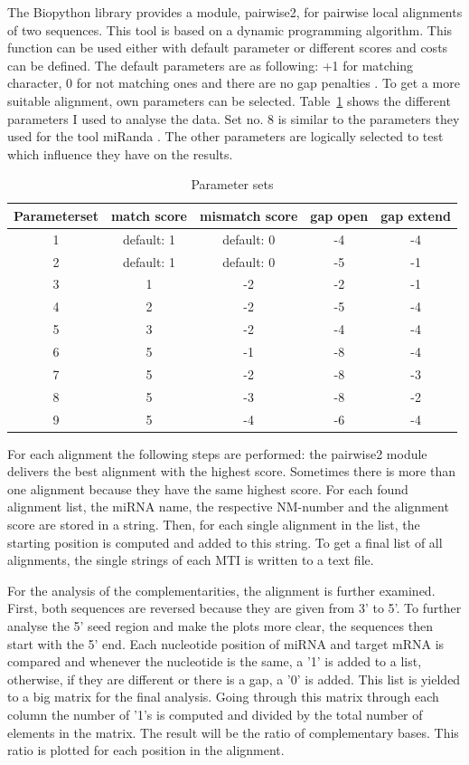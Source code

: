 \documentclass[12pt]{article}
\begin{document}
The Biopython library provides a module, pairwise2, for pairwise local alignments of two sequences. This tool is based on a dynamic programming algorithm. This function can be used either with default parameter or different scores and costs can be defined. The default parameters are as following: +1 for matching character, 0 for not matching ones and there are no gap penalties \cite{pairwise}. To get a more suitable alignment, own parameters can be selected. Table~\ref{table:parameter} shows the different parameters I used to analyse the data. Set no. 8 is similar to the parameters they used for the tool miRanda \cite{Enright}. The other parameters are logically selected to test which influence they have on the results.


\begin{table}
\caption{Parameter sets}
\vspace{0.3cm}
\begin{tabular}{c|c|c|c|c}
Parameterset & match score & mismatch score & gap open & gap extend\\
\hline\hline 
1 & default: 1 & default: 0 & -4 & -4\\
2 &  default: 1 & default: 0 & -5 & -1 \\
3 &  1 & -2 & -2 & -1 \\
4 &  2 & -2 & -5 & -4 \\
5 &  3 & -2 & -4 & -4 \\
6 &  5 & -1 & -8 & -4 \\
7 &  5 & -2 & -8 & -3 \\
8 &  5 & -3 & -8 & -2 \\
9 &  5 & -4 & -6 & -4 \\
\hline
\end{tabular}
\label{table:parameter}
\end{table}

For each alignment the following steps are performed: the pairwise2 module delivers the best alignment with the highest score. Sometimes there is more than one alignment because they have the same highest score. For each found alignment list, the miRNA name, the respective NM-number and the alignment score are stored in a string. Then, for each single alignment in the list, the starting position is computed and added to this string. To get a final list of all alignments, the single strings of each MTI is written to a text file.

For the analysis of the complementarities, the alignment is further examined. First, both sequences are reversed because they are given from 3' to 5'. To further analyse the 5' seed region and make the plots more clear, the sequences then start with the 5' end. 
Each nucleotide position of miRNA and target mRNA is compared and whenever the nucleotide is the same, a '1' is added to a list, otherwise, if they are different or there is a gap, a '0' is added. This list is yielded to a big matrix for the final analysis. Going through this matrix through each column the number of '1's is computed and divided by the total number of elements in the matrix. The result will be the ratio of complementary bases. This ratio is plotted for each position in the alignment. 
\end{document}
